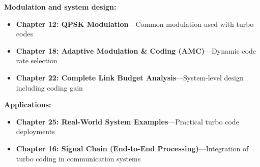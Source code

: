 \textbf{Modulation and system design:}
\begin{itemize}
\item \textbf{Chapter 12: QPSK Modulation}---Common modulation used with turbo codes
\item \textbf{Chapter 18: Adaptive Modulation \& Coding (AMC)}---Dynamic code rate selection
\item \textbf{Chapter 22: Complete Link Budget Analysis}---System-level design including coding gain
\end{itemize}

\textbf{Applications:}
\begin{itemize}
\item \textbf{Chapter 25: Real-World System Examples}---Practical turbo code deployments
\item \textbf{Chapter 16: Signal Chain (End-to-End Processing)}---Integration of turbo coding in communication systems
\end{itemize}
